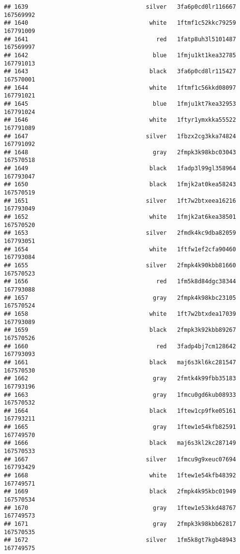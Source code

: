 \documentclass[
]{article}
\begin{document}
\begin{verbatim}
## 1639                                  silver   3fa6p0cd0lr116667 167569992
## 1640                                   white   1ftmf1c52kkc79259 167791009
## 1641                                     red   1fatp8uh3l5101487 167569997
## 1642                                    blue   1fmju1kt1kea32785 167791013
## 1643                                   black   3fa6p0cd8lr115427 167570001
## 1644                                   white   1ftmf1c56kkd08097 167791021
## 1645                                    blue   1fmju1kt7kea32953 167791024
## 1646                                   white   1ftyr1ymxkka55522 167791089
## 1647                                  silver   1fbzx2cg3kka74824 167791092
## 1648                                    gray   2fmpk3k98kbc03043 167570518
## 1649                                   black   1fadp3l99gl358964 167793047
## 1650                                   black   1fmjk2at0kea58243 167570519
## 1651                                  silver   1ft7w2btxeea16216 167793049
## 1652                                   white   1fmjk2at6kea38501 167570520
## 1653                                  silver   2fmdk4kc9dba82059 167793051
## 1654                                   white   1ftfw1ef2cfa90460 167793084
## 1655                                  silver   2fmpk4k90kbb81660 167570523
## 1656                                     red   1fm5k8d84dgc38344 167793088
## 1657                                    gray   2fmpk4k98kbc23105 167570524
## 1658                                   white   1ft7w2btxdea17039 167793089
## 1659                                   black   2fmpk3k92kbb89267 167570526
## 1660                                     red   3fadp4bj7cm128642 167793093
## 1661                                   black   maj6s3kl6kc281547 167570530
## 1662                                    gray   2fmtk4k99fbb35183 167793196
## 1663                                    gray   1fmcu0gd6kub08933 167570532
## 1664                                   black   1ftew1cp9fke05161 167793211
## 1665                                    gray   1ftew1e54kfb82591 167749570
## 1666                                   black   maj6s3kl2kc287149 167570533
## 1667                                  silver   1fmcu9g9xeuc07694 167793429
## 1668                                   white   1ftew1e54kfb48392 167749571
## 1669                                   black   2fmpk4k95kbc01949 167570534
## 1670                                    gray   1ftew1e53kkd48767 167749573
## 1671                                    gray   2fmpk3k98kbb62817 167570535
## 1672                                  silver   1fm5k8gt7kgb48943 167749575

\end{verbatim}
\end{document}
